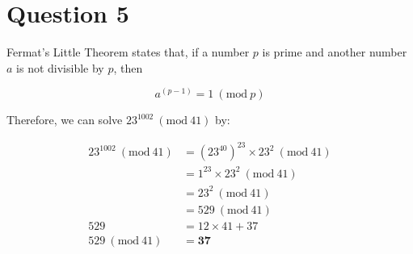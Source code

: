 \documentclass[11pt]{article}
\newcommand{\PMod}[1]{\ (\mathrm{mod}\ #1)}
\begin{document}
\section*{Question 5}
Fermat's Little Theorem states that, if a number $p$ is prime and another number $a$ is not divisible by $p$, then

\[a^{(p-1)} = 1 \PMod{p}\]

Therefore, we can solve $23^{1002} \PMod{41}$ by:

\begin{align*}
    23^{1002} \PMod{41} &= (23^{40})^{23} \times 23^2 \PMod{41}\\
    &= 1^{23} \times 23^2 \PMod{41}\\
    &= 23^2 \PMod{41}\\
    &= 529 \PMod{41}\\
    529 &= 12 \times 41 + 37\\
    529 \PMod{41} &= \boxed{\mathbf{37}}
\end{align*}
\end{document}
